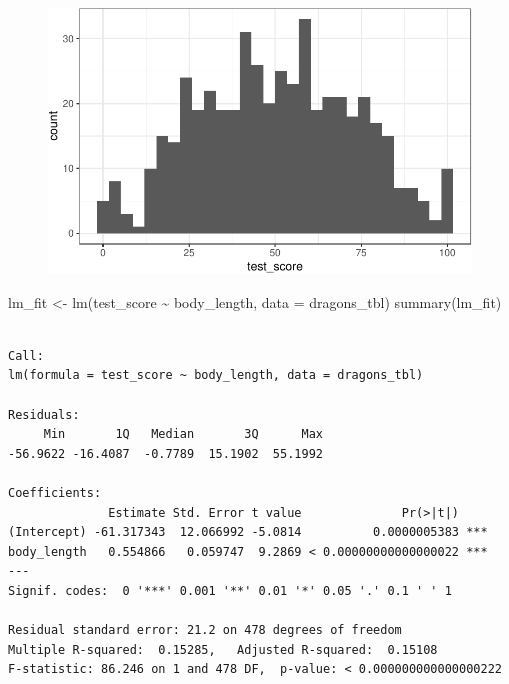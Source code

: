 \documentclass[
  letterpaper,
]{scrbook}
\newenvironment{Shaded}{\begin{snugshade}}{\end{snugshade}}
\newcommand{\AttributeTok}[1]{\textcolor[rgb]{0.40,0.45,0.13}{#1}}
\newcommand{\FunctionTok}[1]{\textcolor[rgb]{0.28,0.35,0.67}{#1}}
\newcommand{\NormalTok}[1]{\textcolor[rgb]{0.00,0.23,0.31}{#1}}
\newcommand{\OtherTok}[1]{\textcolor[rgb]{0.00,0.23,0.31}{#1}}
\newcommand{\SpecialCharTok}[1]{\textcolor[rgb]{0.37,0.37,0.37}{#1}}
\begin{document}
\begin{figure}[H]

{\centering \includegraphics{./stat-modeling-mixed_files/figure-pdf/unnamed-chunk-5-1.pdf}

}

\end{figure}

\begin{Shaded}
\begin{Highlighting}[]
\NormalTok{lm\_fit }\OtherTok{\textless{}{-}} \FunctionTok{lm}\NormalTok{(test\_score }\SpecialCharTok{\textasciitilde{}}\NormalTok{ body\_length, }\AttributeTok{data =}\NormalTok{ dragons\_tbl)}
\FunctionTok{summary}\NormalTok{(lm\_fit)}
\end{Highlighting}
\end{Shaded}

\begin{verbatim}

Call:
lm(formula = test_score ~ body_length, data = dragons_tbl)

Residuals:
     Min       1Q   Median       3Q      Max 
-56.9622 -16.4087  -0.7789  15.1902  55.1992 

Coefficients:
              Estimate Std. Error t value              Pr(>|t|)    
(Intercept) -61.317343  12.066992 -5.0814          0.0000005383 ***
body_length   0.554866   0.059747  9.2869 < 0.00000000000000022 ***
---
Signif. codes:  0 '***' 0.001 '**' 0.01 '*' 0.05 '.' 0.1 ' ' 1

Residual standard error: 21.2 on 478 degrees of freedom
Multiple R-squared:  0.15285,   Adjusted R-squared:  0.15108 
F-statistic: 86.246 on 1 and 478 DF,  p-value: < 0.000000000000000222
\end{verbatim}
\end{document}
